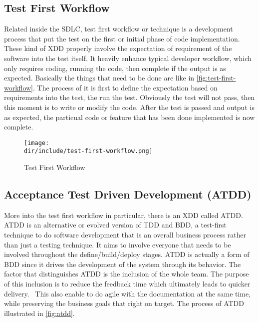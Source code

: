 \subsection{Test First Workflow}

Related inside the \ac{SDLC}, test first workflow or technique is a development process that put the test on the first or initial phase of code implementation.
These kind of \ac{XDD} properly involve the expectation of requirement of the software into the test itself.
It heavily enhance typical developer workflow, which only requires coding, running the code, then complete if the output is as expected.
Basically the things that need to be done are like in \autoref{fig:test-first-workflow}.
The process of it is first to define the expectation based on requirements into the test, the run the test.
Obviously the test will not pass, then this moment is to write or modify the code.
After the test is passed and output is as expected, the particual code or feature that has been done implemented is now complete.

\begin{figure}[!htb]
    \centering
    \texttt{[image: \\dir/include/test-first-workflow.png]}
    \caption{Test First Workflow}
    \label{fig:test-first-workflow}
\end{figure}

\subsection{Acceptance Test Driven Development (ATDD)}

More into the test first workflow in particular, there is an \ac{XDD} called \ac{ATDD}.
\ac{ATDD} is an alternative or evolved version of \ac{TDD} and \ac{BDD}, a test-first technique to do software development that is an overall business process rather than just a testing technique.
It aims to involve everyone that needs to be involved throughout the define/build/deploy stages.
\ac{ATDD} is actually a form of \ac{BDD} since it drives the development of the system through its behavior.
The factor that distinguishes \ac{ATDD} is the inclusion of the whole team.
The purpose of this inclusion is to reduce the feedback time which ultimately leads to quicker delivery.~\autocite{Hatoum:2015:MeteorTestingManual}
This also enable to do agile with the documentation at the same time, while preserving the business goals that right on target.
The process of \ac{ATDD} illustrated in \autoref{fig:atdd}.


